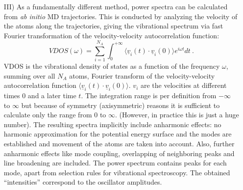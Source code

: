 \documentclass[11pt,DIV=13,BCOR=5mm,a4paper,headinclude]{scrbook}
\renewcommand{\vec}[1]{\underline{#1}}
\begin{document}
\begin{itemize}
\item[III)] As a fundamentally different method, power spectra can be calculated from \textit{ab initio} MD trajectories\cite{VAC}.
This is conducted by analyzing the velocity of the atoms along the trajectories, giving the vibrational spectrum via fast Fourier transformation of the velocity-velocity autocorrelation function:
\begin{equation}
 VDOS(\omega)=\sum_{i=1}^{N_A}\int_{0}^{+\infty}\langle\vec{v}_i(t)\cdot \vec{v}_i(0)\rangle e^{i\omega t}dt ~.
\end{equation}
VDOS is the vibrational density of states as a function of the frequency $\omega$, summing over all $N_A$ atoms, Fourier transform of the velocity-velocity autocorrelation function $\langle\vec{v}_i(t)\cdot \vec{v}_i(0)\rangle$.
$v_i$ are the velocities at different times $0$ and a later time $t$.
The integration range is per definition from $-\infty$ to $\infty$ but because of symmetry (axisymmetric) reasons it is sufficient to calculate only the range from $0$ to $\infty$. (However, in practice this is just a huge number).
The resulting spectra implicitly include anharmonic effects: no harmonic approximation for the potential energy surface and the modes are established and movement of the atoms are taken into account.
Also, further anharmonic effects like mode coupling, overlapping of neighboring peaks and line broadening are included\cite{hornicek2007,hudecova2012}.
The power spectrum contains peaks for each mode, apart from selection rules for vibrational spectroscopy.
The obtained ``intensities'' correspond to the oscillator amplitudes.
\end{itemize}
\end{document}
